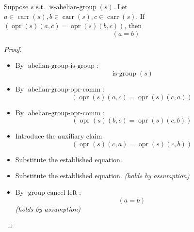 \begin{proposition}
Suppose $s \text{ s.t. } \operatorname{is\text{-}abelian\text{-}group}(s)$. Let $a \in \operatorname{carr}(s), b \in \operatorname{carr}(s), c \in \operatorname{carr}(s)$. If $(\operatorname{opr}(s)(a, c) = \operatorname{opr}(s)(b, c))$, then 
\begin{equation*}
(a = b)
\end{equation*}

\end{proposition}

\begin{proof}
\begin{itemize}
  \item[\textbf{5}] By $\operatorname{abelian\text{-}group\text{-}is\text{-}group}$:
\begin{equation*}
\operatorname{is\text{-}group}(s)
\end{equation*}

  \item[\textbf{6}] By $\operatorname{abelian\text{-}group\text{-}opr\text{-}comm}$:
\begin{equation*}
(\operatorname{opr}(s)(a, c) = \operatorname{opr}(s)(c, a))
\end{equation*}

  \item[\textbf{7}] By $\operatorname{abelian\text{-}group\text{-}opr\text{-}comm}$:
\begin{equation*}
(\operatorname{opr}(s)(b, c) = \operatorname{opr}(s)(c, b))
\end{equation*}

  \item[\textbf{8}] Introduce the auxiliary claim
\begin{equation*}
(\operatorname{opr}(s)(c, a) = \operatorname{opr}(s)(c, b))
\end{equation*}

  \item[\textbf{9}] Substitute the established equation.
  \item[\textbf{10--11}] Substitute the established equation.  \emph{(holds by assumption)}
  \item[\textbf{12--13}] By $\operatorname{group\text{-}cancel\text{-}left}$:
\begin{equation*}
(a = b)
\end{equation*}
  \emph{(holds by assumption)}
\end{itemize}
\end{proof}
